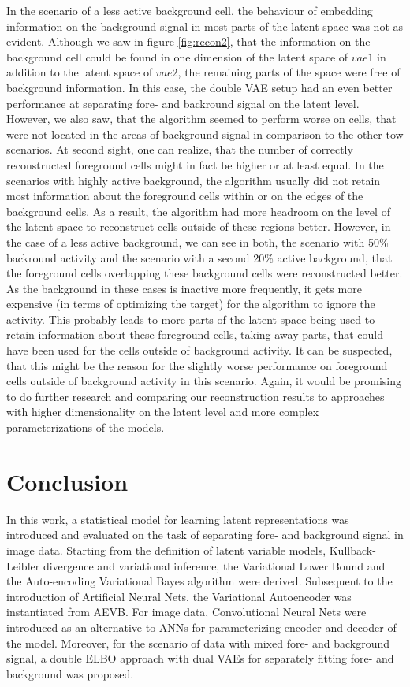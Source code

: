 \documentclass[12pt]{report}
\theoremstyle{definition}
\begin{document}
In the scenario of a less active background cell, the behaviour of embedding information on the background signal in most parts of the latent space was not as evident. Although we saw in figure \ref{fig:recon2}, that the information on the background cell could be found in one dimension of the latent space of $vae1$ in addition to the latent space of $vae2$, the remaining parts of the space were free of background information. In this case, the double VAE setup had an even better performance at separating fore- and backround signal on the latent level. However, we also saw, that the algorithm seemed to perform worse on cells, that were not located in the areas of background signal in comparison to the other tow scenarios. At second sight, one can realize, that the number of correctly reconstructed foreground cells might in fact be higher or at least equal. In the scenarios with highly active background, the algorithm usually did not retain most information about the foreground cells within or on the edges of the background cells. As a result, the algorithm had more headroom on the level of the latent space to reconstruct cells outside of these regions better. However, in the case of a less active background, we can see in both, the scenario with 50\% backround activity and the scenario with a second 20\% active background, that the foreground cells overlapping these background cells were reconstructed better. As the background in these cases is inactive more frequently, it gets more expensive (in terms of optimizing the target) for the algorithm to ignore the activity. This probably leads to more parts of the latent space being used to retain information about these foreground cells, taking away parts, that could have been used for the cells outside of background activity. It can be suspected, that this might be the reason for the slightly worse performance on foreground cells outside of background activity in this scenario. Again, it would be promising to do further research and comparing our reconstruction results to approaches with higher dimensionality on the latent level and more complex parameterizations of the models. 

\chapter{Conclusion}
In this work, a statistical model for learning latent representations was introduced and evaluated on the task of separating fore- and background signal in image data. Starting from the definition of latent variable models, Kullback-Leibler divergence and variational inference, the Variational Lower Bound and the Auto-encoding Variational Bayes algorithm were derived. Subsequent to the introduction of Artificial Neural Nets, the Variational Autoencoder was instantiated from AEVB. For image data, Convolutional Neural Nets were introduced as an alternative to ANNs for parameterizing encoder and decoder of the model. Moreover, for the scenario of data with mixed fore- and background signal, a double ELBO approach with dual VAEs for separately fitting fore- and background was proposed.
\end{document}
